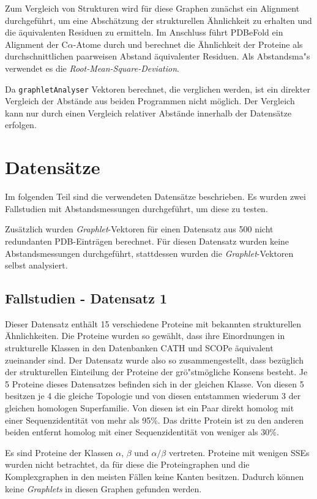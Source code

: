 \documentclass{report}
\begin{document}
Zum Vergleich von Strukturen wird f\"ur diese Graphen zun\"achst ein Alignment durchgef\"uhrt, um eine Absch\"atzung der strukturellen \"Ahnlichkeit zu erhalten und die \"aquivalenten Residuen zu ermitteln. Im Anschluss f\"uhrt PDBeFold ein Alignment der C$\alpha$-Atome durch und berechnet die \"Ahnlichkeit der Proteine als durchschnittlichen paarweisen Abstand \"aquivalenter Residuen. Als Abstandsma"s verwendet es die \textit{Root-Mean-Square-Deviation}.

Da \texttt{graphletAnalyser} Vektoren berechnet, die verglichen werden, ist ein direkter Vergleich der Abst\"ande aus beiden Programmen nicht m\"oglich. Der Vergleich kann nur durch einen Vergleich relativer Abst\"ande innerhalb der Datens\"atze erfolgen.


\section{Datens\"atze}

Im folgenden Teil sind die verwendeten Datens\"atze beschrieben. Es wurden zwei Fallstudien mit Abstandsmessungen durchgef\"uhrt, um diese zu testen.

Zus\"atzlich wurden \textit{Graphlet}-Vektoren f\"ur einen Datensatz aus 500 nicht redundanten PDB-Eintr\"agen berechnet. F\"ur diesen Datensatz wurden keine Abstandsmessungen durchgef\"uhrt, stattdessen wurden die \textit{Graphlet}-Vektoren selbst analysiert.


\subsection{Fallstudien  - Datensatz 1}


Dieser Datensatz enth\"alt 15 verschiedene Proteine mit bekannten strukturellen \"Ahnlichkeiten. Die Proteine wurden so gew\"ahlt, dass ihre Einordnungen in strukturelle Klassen in den Datenbanken CATH und SCOPe \"aquivalent zueinander sind.
Der Datensatz wurde also so zusammengestellt, dass bez\"uglich der strukturellen Einteilung der Proteine der gr\"o"stm\"ogliche Konsens besteht.
Je 5 Proteine dieses Datensatzes befinden sich in der gleichen Klasse. Von diesen 5 besitzen je 4 die gleiche Topologie und von diesen entstammen wiederum 3 der gleichen homologen Superfamilie. Von diesen ist ein Paar direkt homolog mit einer Sequenzidentit\"at von mehr als 95\%. Das dritte Protein ist zu den anderen beiden entfernt homolog mit einer Sequenzidentit\"at von weniger als 30\%.

Es sind Proteine der Klassen $\alpha$, $\beta$ und $\alpha/\beta$ vertreten. Proteine mit wenigen SSEs wurden nicht betrachtet, da f\"ur diese die Proteingraphen und die Komplexgraphen in den meisten F\"allen keine Kanten besitzen. Dadurch k\"onnen keine \textit{Graphlets} in diesen Graphen gefunden werden.
\end{document}
